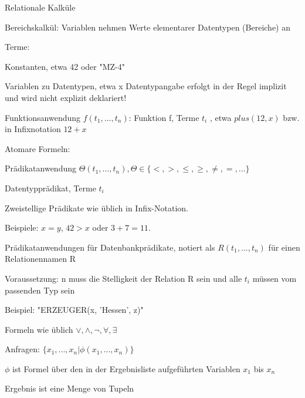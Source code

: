 \documentclass[a4paper]{article}
\begin{document}
\begin{multicols}{3}
Relationale Kalküle
\begin{itemize*}
\item Bereichskalkül: Variablen nehmen Werte elementarer Datentypen (Bereiche) an
\begin{itemize*}
    \item Terme:
    \begin{itemize*}
        \item Konstanten, etwa 42 oder "MZ-4"
        \item Variablen zu Datentypen, etwa x Datentypangabe erfolgt in der Regel implizit und wird nicht explizit deklariert!
        \item Funktionsanwendung $f(t_1,...,t_n )$: Funktion f, Terme $t_i$ , etwa $plus(12, x)$ bzw. in Infixnotation $12 + x$
    \end{itemize*}
    \item Atomare Formeln:
    \begin{itemize*}
        \item Prädikatanwendung $\Theta(t_1,...,t_n ), \Theta\in\{<, >, \leq, \geq, \not = , =,...\}$
        \begin{itemize*}
            \item Datentypprädikat, Terme $t_i$
            \item Zweistellige Prädikate wie üblich in Infix-Notation.
            \item Beispiele: $x = y$, $42 > x$ oder $3 + 7 = 11$.
        \end{itemize*}
        \item Prädikatanwendungen für Datenbankprädikate, notiert als $R(t_1,...,t_n)$ für einen Relationennamen R
        \begin{itemize*}
            \item Voraussetzung: n muss die Stelligkeit der Relation R sein und alle $t_i$ müssen vom passenden Typ sein
            \item Beispiel: "ERZEUGER(x, ’Hessen’, z)"
        \end{itemize*}
        \item Formeln wie üblich $\vee, \wedge, \neg, \forall, \exists$
    \end{itemize*}
    \item Anfragen: $\{x_1,..., x_n | \phi(x_1,..., x_n )\}$
    \begin{itemize*}
        \item $\phi$ ist Formel über den in der Ergebnisliste aufgeführten Variablen $x_1$ bis $x_n$
        \item Ergebnis ist eine Menge von Tupeln

\end{itemize*}
\end{itemize*}
\end{itemize*}
\end{multicols}
\end{document}
